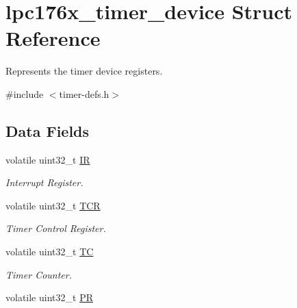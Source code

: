 \hypertarget{structlpc176x__timer__device}{}\section{lpc176x\+\_\+timer\+\_\+device Struct Reference}
\label{structlpc176x__timer__device}


Represents the timer device registers.  




{\ttfamily \#include $<$timer-\/defs.\+h$>$}

\subsection*{Data Fields}
\begin{DoxyCompactItemize}
\item 
\mbox{\label{structlpc176x__timer__device_af1c6585bb740b5e5f2ff7c85f9fb3199}} 
volatile uint32\+\_\+t \mbox{\hyperlink{structlpc176x__timer__device_af1c6585bb740b5e5f2ff7c85f9fb3199}{IR}}
\begin{DoxyCompactList}\small\item\em Interrupt Register. \end{DoxyCompactList}\item 
\mbox{\label{structlpc176x__timer__device_a9f66f57ad152479e13470e0eb9fcd9cb}} 
volatile uint32\+\_\+t \mbox{\hyperlink{structlpc176x__timer__device_a9f66f57ad152479e13470e0eb9fcd9cb}{T\+CR}}
\begin{DoxyCompactList}\small\item\em Timer Control Register. \end{DoxyCompactList}\item 
\mbox{\label{structlpc176x__timer__device_a178e4f9ee8b15a30cc7e85c024b27764}} 
volatile uint32\+\_\+t \mbox{\hyperlink{structlpc176x__timer__device_a178e4f9ee8b15a30cc7e85c024b27764}{TC}}
\begin{DoxyCompactList}\small\item\em Timer Counter. \end{DoxyCompactList}\item 
\mbox{\label{structlpc176x__timer__device_a1e6a6f0b8f10d5cb1281d12fd8ad6614}} 
volatile uint32\+\_\+t \mbox{\hyperlink{structlpc176x__timer__device_a1e6a6f0b8f10d5cb1281d12fd8ad6614}{PR}}

\end{DoxyCompactItemize}
